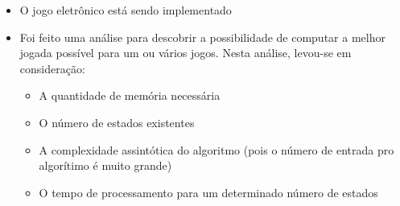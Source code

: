 \begin{itemize}
\item
  O jogo eletrônico está sendo implementado
\item
  Foi feito uma análise para descobrir a possibilidade de computar a
  melhor jogada possível para um ou vários jogos. Nesta análise,
  levou-se em consideração:

  \begin{itemize}
  \tightlist
  \item
    A quantidade de memória necessária
  \item
    O número de estados existentes
  \item
    A complexidade assintótica do algoritmo (pois o número de entrada
    pro algorítimo é muito grande)
  \item
    O tempo de processamento para um determinado número de estados
  \end{itemize}
\end{itemize}
